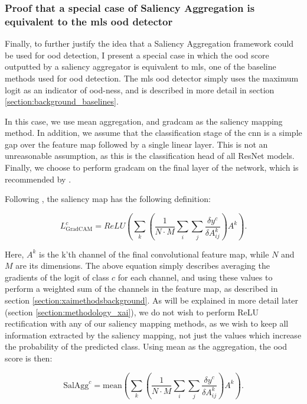 \documentclass[UKenglish]{uiomasterthesis} %
\theoremstyle{definition}
\begin{document}
\subsubsection{Proof that a special case of Saliency Aggregation is equivalent to the \acf{mls} \ac{ood} detector}

Finally, to further justify the idea that a Saliency Aggregation framework could be used for \ac{ood} detection, I present a special case in which the \ac{ood} score outputted by a saliency aggregator is equivalent to \ac{mls}, one of the baseline methods used for \ac{ood} detection. The \ac{mls} \ac{ood} detector simply uses the maximum logit as an indicator of \ac{ood}-ness, and is described in more detail in section \ref{section:background_baselines}.

In this case, we use mean aggregation, and \ac{gradcam} as the saliency mapping method. In addition, we assume that the classification stage of the \ac{cnn} is a simple \ac{gap} over the feature map followed by a single linear layer. This is not an unreasonable assumption, as this is the classification head of all ResNet models. Finally, we choose to perform \ac{gradcam} on the final layer of the network, which is recommended by \cite{gradcam}.

Following \cite{gradcam}, the saliency map has the following definition:

\begin{equation}
    L^c_{\text{GradCAM}} = ReLU\left(\sum_k \left( \frac{1}{N \cdot M} \sum_i \sum_j \frac{\delta y^c}{\delta A_{ij}^k} \right) A^k \right).
\end{equation}

Here, $A^k$ is the k'th channel of the final convolutional feature map, while $N$ and $M$ are its dimensions. The above equation simply describes averaging the gradients of the logit of class $c$ for each channel, and using these values to perform a weighted sum of the channels in the feature map, as described in section \ref{section:xaimethodsbackground}. As will be explained in more detail later (section \ref{section:methodology_xai}), we do not wish to perform ReLU rectification with any of our saliency mapping methods, as we wish to keep all information extracted by the saliency mapping, not just the values which increase the probability of the predicted class. Using mean as the aggregation, the \ac{ood} score is then:

\begin{equation}
    \text{SalAgg}^c = \text{mean} \left(\sum_k \left( \frac{1}{N \cdot M} \sum_i \sum_j \frac{\delta y^c}{\delta A_{ij}^k} \right) A^k \right).
\end{equation}
\end{document}
